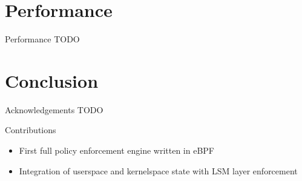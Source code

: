 \documentclass[12pt, dvipsnames]{beamer}
\begin{document}
\section{Performance}

\begin{frame}[t]{Performance}
TODO
\end{frame}

\section{Conclusion}

\begin{frame}[t]{Acknowledgements}
TODO
\end{frame}

\begin{frame}[t]{Contributions}
\begin{itemize}
    \item First full policy enforcement engine written in eBPF
    \item Integration of \alert{userspace} and \alert{kernelspace} state with \alert{LSM layer enforcement}
\end{itemize}
\end{frame}
\end{document}
